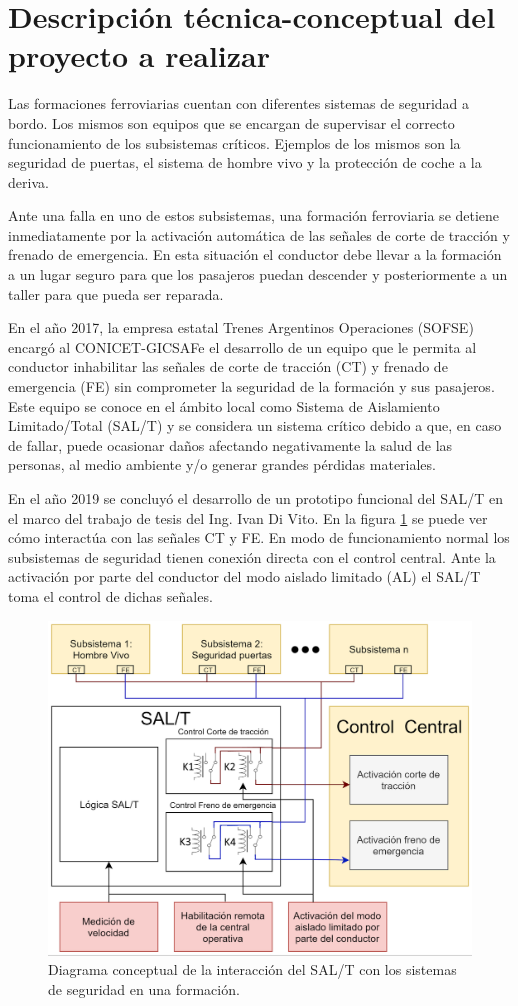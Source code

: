 \documentclass[11pt]{charter}
\begin{document}
\section{Descripción técnica-conceptual del proyecto a realizar}
\label{sec:descripcion}

Las formaciones ferroviarias cuentan con diferentes sistemas de seguridad a bordo. Los mismos son equipos que se
encargan de supervisar el correcto funcionamiento de los subsistemas críticos. Ejemplos de los mismos son la seguridad
de puertas, el sistema de hombre vivo y la protección de coche a la deriva.

Ante una falla en uno de estos subsistemas, una formación ferroviaria se detiene inmediatamente por la activación 
automática de las señales de corte de tracción y frenado de emergencia. En esta situación el conductor debe llevar a la 
formación a un lugar seguro para que los pasajeros puedan descender y posteriormente a un taller para que pueda ser 
reparada.

En el año 2017, la empresa estatal Trenes Argentinos Operaciones (SOFSE) encargó al CONICET-GICSAFe el desarrollo de un 
equipo que le permita al conductor inhabilitar las señales de corte de tracción (CT) y frenado de emergencia (FE) sin comprometer 
la seguridad de la formación y sus pasajeros. Este equipo se conoce en el ámbito local como Sistema de Aislamiento 
Limitado/Total (SAL/T) y se considera un sistema crítico debido a que, en caso de fallar, puede 
ocasionar daños afectando negativamente la salud de las personas, al medio ambiente y/o generar grandes pérdidas 
materiales.

En el año 2019 se concluyó el desarrollo de un prototipo funcional del SAL/T  en el marco del trabajo de tesis del Ing. 
Ivan Di Vito. En la figura \ref{fig:diagrama_de_bloques} se puede ver cómo interactúa con las señales CT y FE. En modo 
de funcionamiento normal los subsistemas de seguridad tienen conexión directa con el control central. Ante la activación 
por parte del conductor del modo aislado limitado (AL) el SAL/T toma el control de dichas señales.

\begin{figure}[htpb]
\centering 
\includegraphics[width=.85\textwidth]{./Figuras/diagrama_de_bloques.png}
\caption{Diagrama conceptual de la interacción del SAL/T con los sistemas de seguridad en una formación.}
\label{fig:diagrama_de_bloques}
\end{figure}
\end{document}
